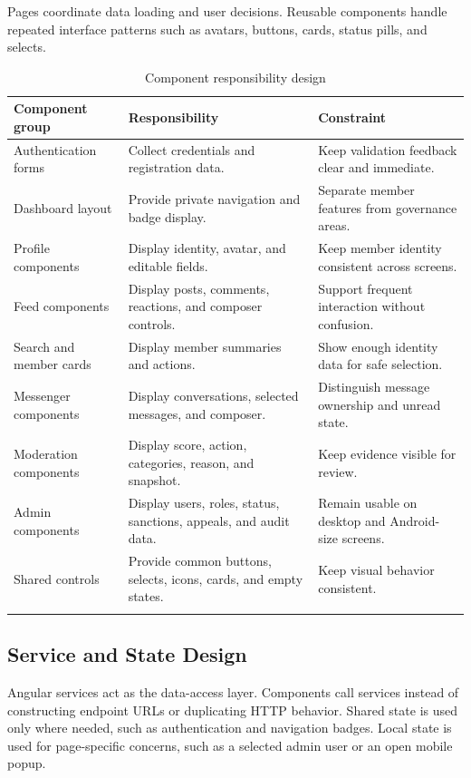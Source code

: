 Pages coordinate data loading and user decisions. Reusable components handle repeated interface patterns such as avatars, buttons, cards, status pills, and selects.

\begin{longtable}{|m{3.5cm}|m{5.1cm}|m{5.4cm}|}
\hline
\textbf{Component group} & \textbf{Responsibility} & \textbf{Constraint} \\
\hline
Authentication forms & Collect credentials and registration data. & Keep validation feedback clear and immediate. \\
\hline
Dashboard layout & Provide private navigation and badge display. & Separate member features from governance areas. \\
\hline
Profile components & Display identity, avatar, and editable fields. & Keep member identity consistent across screens. \\
\hline
Feed components & Display posts, comments, reactions, and composer controls. & Support frequent interaction without confusion. \\
\hline
Search and member cards & Display member summaries and actions. & Show enough identity data for safe selection. \\
\hline
Messenger components & Display conversations, selected messages, and composer. & Distinguish message ownership and unread state. \\
\hline
Moderation components & Display score, action, categories, reason, and snapshot. & Keep evidence visible for review. \\
\hline
Admin components & Display users, roles, status, sanctions, appeals, and audit data. & Remain usable on desktop and Android-size screens. \\
\hline
Shared controls & Provide common buttons, selects, icons, cards, and empty states. & Keep visual behavior consistent. \\
\hline
\caption{Component responsibility design}
\end{longtable}

\subsection*{Service and State Design}

Angular services act as the data-access layer. Components call services instead of constructing endpoint URLs or duplicating HTTP behavior. Shared state is used only where needed, such as authentication and navigation badges. Local state is used for page-specific concerns, such as a selected admin user or an open mobile popup.

